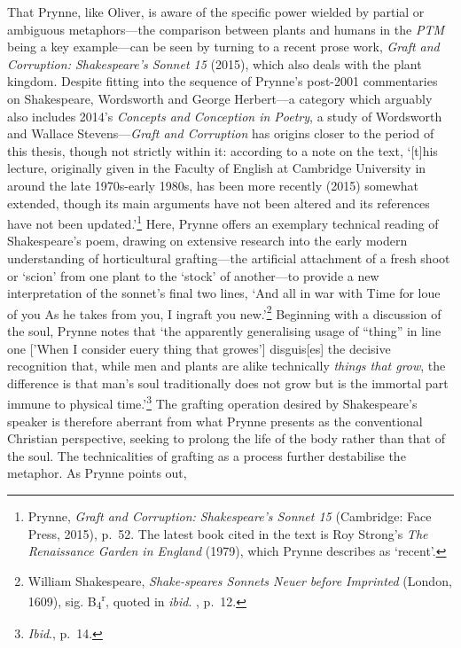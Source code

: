 \documentclass[]{article}
\begin{document}
That Prynne, like Oliver, is aware of the specific power wielded by
partial or ambiguous metaphors—the comparison between plants and humans
in the \emph{PTM} being a key example—can be seen by turning to a recent
prose work, \emph{Graft and Corruption: Shakespeare’s Sonnet 15} (2015),
which also deals with the plant kingdom. Despite fitting into the
sequence of Prynne’s post-2001 commentaries on Shakespeare, Wordsworth
and George Herbert—a category which arguably also includes 2014’s
\emph{Concepts and Conception in Poetry}, a study of Wordsworth and
Wallace Stevens—\emph{Graft and Corruption} has origins closer to the
period of this thesis, though not strictly within it: according to a
note on the text, ‘{[}t{]}his lecture, originally given in the Faculty
of English at Cambridge University in around the late 1970s-early 1980s,
has been more recently (2015) somewhat extended, though its main
arguments have not been altered and its references have not been
updated.’\footnote{Prynne, \emph{Graft and Corruption: Shakespeare’s
  Sonnet 15} (Cambridge: Face Press, 2015), p.~52. The latest book cited
  in the text is Roy Strong’s \emph{The Renaissance Garden in England}
  (1979), which Prynne describes as ‘recent’.} Here, Prynne offers an
exemplary technical reading of Shakespeare’s poem, drawing on extensive
research into the early modern understanding of horticultural
grafting—the artificial attachment of a fresh shoot or ‘scion’ from one
plant to the ‘stock’ of another—to provide a new interpretation of the
sonnet’s final two lines, ‘And all in war with Time for loue of you
\textbar{} As he takes from you, I ingraft you new.’\footnote{William
  Shakespeare, \emph{Shake-speares Sonnets Neuer before Imprinted}
  (London, 1609), sig. B\textsubscript{4}\textsuperscript{r}, quoted in
  \emph{ibid}. , p.~12.} Beginning with a discussion of the soul, Prynne
notes that ‘the apparently generalising usage of “thing” in line one
{[}’When I consider euery thing that growes’{]} disguis{[}es{]} the
decisive recognition that, while men and plants are alike technically
\emph{things that grow}, the difference is that man’s soul traditionally
does not grow but is the immortal part immune to physical
time.’\footnote{\emph{Ibid}., p.~14.} The grafting operation desired by
Shakespeare’s speaker is therefore aberrant from what Prynne presents as
the conventional Christian perspective, seeking to prolong the life of
the body rather than that of the soul. The technicalities of grafting as
a process further destabilise the metaphor. As Prynne points out,
\end{document}
